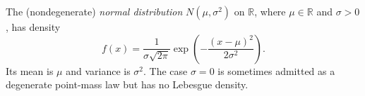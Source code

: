 
The (nondegenerate) \emph{normal distribution} $N(\mu,\sigma^2)$ on $\mathbb R$, where $\mu\in\mathbb R$ and $\sigma>0$, has density
\[
f(x)=\frac{1}{\sigma\sqrt{2\pi}}\exp\left(-\frac{(x-\mu)^2}{2\sigma^2}\right).
\]
Its mean is $\mu$ and variance is $\sigma^2$. The case $\sigma=0$ is sometimes admitted as a degenerate point-mass law but has no Lebesgue density.

